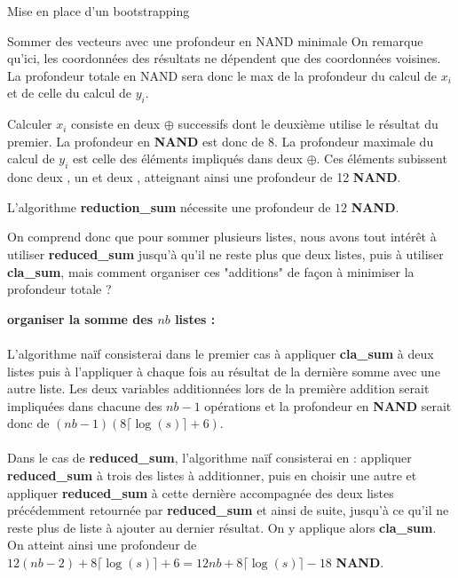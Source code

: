 \begin{section}{Mise en place d'un bootstrapping}
\begin{subsection}{Sommer des vecteurs avec une profondeur en NAND minimale}
	On remarque qu'ici, les coordonnées des résultats ne dépendent que des coordonnées voisines. La profondeur totale en NAND sera donc le max de la profondeur du calcul de $x_i$ et de celle du calcul de $y_i$.
	
	Calculer $x_i$ consiste en deux $\oplus$ successifs dont le deuxième utilise le résultat du premier. La profondeur en \textbf{NAND} est donc de 8. La profondeur maximale du calcul de $y_i$ est celle des éléments impliqués dans deux $\oplus$. Ces éléments subissent donc deux , un  et deux , atteignant ainsi une profondeur de 12 \textbf{NAND}.

\begin{prop}
	L'algorithme \textbf{reduction\_sum} nécessite une profondeur de $12$ \textbf{NAND}.
\end{prop}

	On comprend donc que pour sommer plusieurs listes, nous avons tout
	intérêt à utiliser \textbf{reduced\_sum} jusqu'à qu'il ne reste plus
	que deux listes, puis à utiliser \textbf{cla\_sum}, mais comment organiser ces "additions" de façon à minimiser la profondeur totale ?

\vspace{0.3cm}
\noindent
\textbf{organiser la somme des $nb$ listes :}
\paragraph{}
	L'algorithme naïf consisterai dans le premier cas à appliquer
	\textbf{cla\_sum} à deux listes puis à l'appliquer à chaque fois au
	résultat de la dernière somme avec une autre liste. Les deux variables
	additionnées lors de la première addition serait impliquées dans
	chacune	des $nb-1$ opérations et la profondeur en \textbf{NAND} serait
	donc de $(nb-1)(8\lceil\log(s)\rceil + 6)$.
	
\paragraph{}
	Dans le cas de \textbf{reduced\_sum}, l'algorithme naïf consisterai en
	: appliquer \textbf{reduced\_sum} à trois des listes à additionner,
	puis en choisir une autre et appliquer \textbf{reduced\_sum} à cette
	dernière accompagnée des deux listes précédemment retournée par
	\textbf{reduced\_sum} et ainsi de suite, jusqu'à ce qu'il ne reste plus
	de liste à ajouter au dernier résultat. On y applique alors \textbf{cla\_sum}. On atteint ainsi une profondeur de 
	$12(nb - 2) + 8 \lceil \log(s) \rceil + 6 = 12 nb + 8 \lceil \log(s)
	\rceil - 18$ \textbf{NAND}.
	

\end{subsection}
\end{section}
